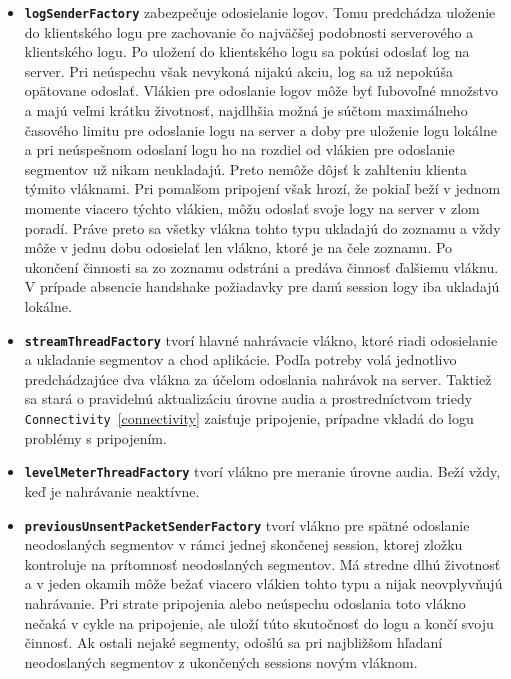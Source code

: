 \begin{itemize}
    \item{\texttt{\textbf{logSenderFactory}} zabezpečuje odosielanie logov. Tomu predchádza uloženie do klientského logu pre zachovanie čo najväčšej podobnosti serverového a klientského logu. Po uložení do klientského logu sa pokúsi odoslať log na server. Pri neúspechu však nevykoná nijakú akciu, log sa už nepokúša opätovane odoslať. Vlákien pre odoslanie logov môže byť ľubovoľné množstvo a majú veľmi krátku životnosť, najdlhšia možná je súčtom maximálneho časového limitu pre odoslanie logu na server a doby pre uloženie logu lokálne a pri neúspešnom odoslaní logu ho na rozdiel od vlákien pre odoslanie segmentov už nikam neukladajú. Preto nemôže dôjsť k zahlteniu klienta týmito vláknami. Pri pomalšom pripojení však hrozí, že pokiaľ beží v jednom momente viacero týchto vlákien, môžu odoslať svoje logy na server v zlom poradí. Práve preto sa všetky vlákna tohto typu ukladajú do zoznamu a vždy môže v jednu dobu odosielať len vlákno, ktoré je na čele zoznamu. Po ukončení činnosti sa zo zoznamu odstráni a predáva činnosť ďalšiemu vláknu. V prípade absencie handshake požiadavky pre danú session logy iba ukladajú lokálne.}

 \item{\texttt{\textbf{streamThreadFactory}} tvorí hlavné nahrávacie vlákno, ktoré riadi odosielanie a ukladanie segmentov a chod aplikácie. Podľa potreby volá jednotlivo predchádzajúce dva vlákna za účelom odoslania nahrávok na server. Taktiež sa stará o pravidelnú aktualizáciu úrovne audia a prostredníctvom triedy \texttt{Connectivity}~\ref{connectivity} zaisťuje pripojenie, prípadne vkladá do logu problémy s pripojením.}

 \item{\texttt{\textbf{levelMeterThreadFactory}} tvorí vlákno pre meranie úrovne audia. Beží vždy, keď je nahrávanie neaktívne.}

 \item{\texttt{\textbf{previousUnsentPacketSenderFactory}} tvorí vlákno pre spätné odoslanie neodoslaných segmentov v rámci jednej skončenej session, ktorej zložku kontroluje na prítomnosť neodoslaných segmentov. Má stredne dlhú životnosť a v jeden okamih môže bežať viacero vlákien tohto typu a nijak neovplyvňujú nahrávanie. Pri strate pripojenia alebo neúspechu odoslania toto vlákno nečaká v cykle na pripojenie, ale uloží túto skutočnosť do logu a končí svoju činnosť. Ak ostali nejaké segmenty, odošlú sa pri najbližšom hľadaní neodoslaných segmentov z ukončených sessions novým vláknom. }
\end{itemize}

